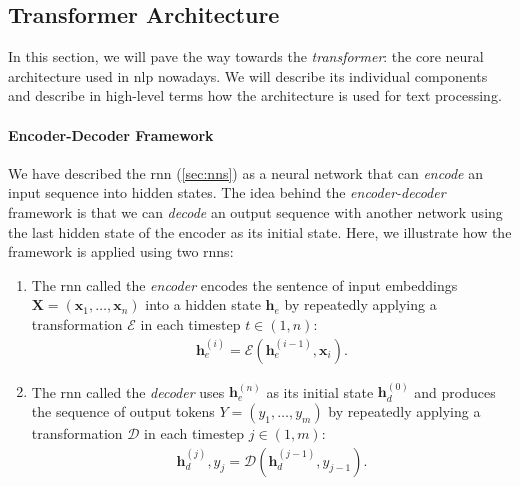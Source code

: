 {\subsection{Transformer Architecture}
\label{sec:transformer}
In this section, we will pave the way towards the \emph{transformer}: the core neural architecture used in \ac{nlp} nowadays. We will describe its individual components and describe in high-level terms how the architecture is used for text processing.

\paragraph{Encoder-Decoder Framework}
We have described the \ac{rnn} (\autoref{sec:nns}) as a neural network that can \emph{encode} an input sequence into hidden states. The idea behind the \emph{encoder-decoder} framework \cite{sutskever2014sequence,cho2014learning} is that we can \emph{decode} an output sequence with another network using the last hidden state of the encoder as its initial state. Here, we illustrate how the framework is applied using two \acp{rnn}:

\begin{enumerate}
    \item The \ac{rnn} called the \emph{encoder} encodes the sentence of input embeddings $\mathbf{X}= (\mathbf{x}_1, \ldots, \mathbf{x}_n)$ into a hidden state $\mathbf{h}_e$ by repeatedly applying a transformation $\mathcal{E}$ in each timestep $t\in(1,n)$:
          \begin{align}
              \mathbf{h}_e^{(i)} = \mathcal{E}(\mathbf{h}_e^{(i-1)}, \mathbf{x}_i).
          \end{align}
    \item The \ac{rnn} called the \emph{decoder} uses $\mathbf{h}_e^{(n)}$ as its initial state $\mathbf{h}_d^{(0)}$ and produces the sequence of output tokens  $Y = (y_1, \ldots, y_m)$ by repeatedly applying a transformation $\mathcal{D}$ in each timestep $j\in(1,m)$:
          \begin{align}
              \mathbf{h}_d^{(j)}, y_j = \mathcal{D}(\mathbf{h}_d^{(j-1)}, y_{j-1}).
          \end{align}
\end{enumerate}

}
